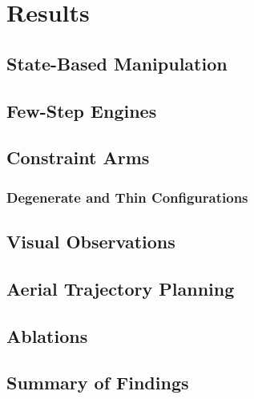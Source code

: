 \chapter{Results}\label{ch:results}
\section{State-Based Manipulation}\label{sec:res:state}
\section{Few-Step Engines}\label{sec:res:fewstep}
\section{Constraint Arms}\label{sec:res:constraints}
\subsection{Degenerate and Thin Configurations}\label{sec:res:constraints:degenerate}
\section{Visual Observations}\label{sec:res:visual}
\section{Aerial Trajectory Planning}\label{sec:res:uav}
\section{Ablations}\label{sec:res:ablations}
\section{Summary of Findings}\label{sec:res:summary}

